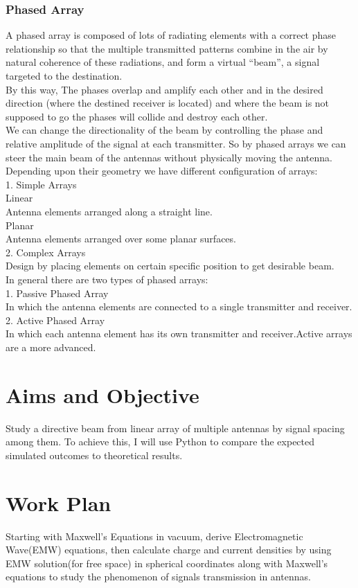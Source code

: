 \subsubsection{Phased Array}
A phased array is composed of lots of radiating elements with a correct phase relationship so that the multiple transmitted patterns combine in the air by natural coherence of these radiations, and form a virtual “beam”, a signal targeted to the destination.\\
By this way, The phases overlap and amplify each other and in the desired direction (where the destined receiver is located) and where the beam is not supposed to go the phases will collide and destroy each other.\\
We can change the directionality of the beam by controlling the phase and relative amplitude of the signal at each transmitter. So by phased arrays we can steer the main beam of the antennas without physically moving the antenna.\\
Depending upon their geometry we have different configuration of arrays:\\
1. Simple Arrays\\
 Linear\\
  Antenna elements arranged along a straight line.\\
 Planar\\
  Antenna elements arranged over some planar surfaces.\\
2. Complex Arrays\\
Design by placing elements on certain specific position to get desirable beam.\\
In general there are two types of phased arrays:\\
1. Passive Phased Array\\
In which the antenna elements are connected to a single transmitter and receiver.\\
2. Active Phased Array\\
In which each antenna element has its own transmitter and receiver.Active arrays are a more advanced.

\section{Aims and Objective}
Study a directive beam from linear array of multiple antennas by signal spacing among them. 
To achieve this, I will use Python to compare the expected simulated outcomes to theoretical results.

\section{Work Plan}
Starting with Maxwell's Equations in vacuum, derive Electromagnetic Wave(EMW) equations, then calculate charge and current densities by using EMW solution(for free space) in spherical coordinates along with Maxwell's equations to study the phenomenon of signals transmission in antennas.

%

